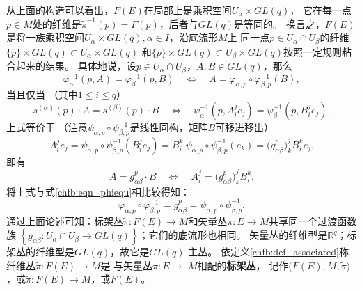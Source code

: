 从上面的构造可以看出，$F(E)$在局部上是乘积空间$U_{\alpha} \times GL(q)$，
它在每一点$p \in M$处的纤维是$\tilde{\pi}^{-1}(p)=F(p)$，后者与$GL(q)$是等同的。
换言之，$F(E)$是将一族乘积空间$U_{\alpha} \times GL(q), \alpha \in I$，沿底流形$M$上
同一点$p \in U_{\alpha} \cap U_{\beta}$的纤维$\{p\} \times GL(q) \subset U_{\alpha} \times GL(q)$
和$\{p\} \times GL(q) \subset U_{\beta} \times GL(q)$按照一定规则粘合起来的结果。
具体地说，设$p \in U_{\alpha} \cap U_{\beta}$，$ A, B \in GL(q)$，那么
\begin{equation}\label{chfb:eqn_phiequ}
    \varphi_{\alpha}^{-1}(p, A)=\varphi_{\beta}^{-1}(p, B)
    \quad \Leftrightarrow \quad
    A=\varphi_{\alpha, p} \circ \varphi_{\beta, p}^{-1}(B) ,
\end{equation}
当且仅当 （其中$1 \leqslant i \leqslant q $）
\begin{equation}
    s^{(\alpha)}(p) \cdot A=s^{(\beta)}(p) \cdot B
    \quad \Leftrightarrow \quad
    \psi_{\alpha}^{-1}(p, A_{i}^{j} e_{j})
    =\psi_{\beta}^{-1}(p, B_{i}^{j} e_{j}).
\end{equation}
上式等价于 （注意$\psi_{\alpha, p} \circ \psi_{\beta, p}^{-1}$是线性同构，矩阵$B$可移进移出）
\begin{equation}
    A_{i}^{j} e_{j}=\psi_{\alpha, p} \circ \psi_{\beta, p}^{-1}(B_{i}^{j}e_{j})
    =B_{i}^{k}\ \psi_{\alpha, p} \circ \psi_{\beta, p}^{-1}(e_{k})
    =\bigl(g_{\alpha \beta}^p\bigr)_{k}^{j} B_{i}^{k} e_{j} .
\end{equation}
即有
\begin{equation}\label{chfb:eqn_agb}
    A=g_{\alpha \beta}^p \cdot B \quad \Leftrightarrow \quad
    A_{i}^{j}  = \bigl(g_{\alpha \beta}^p\bigr)_{k}^{j} B_{i}^{k}.
\end{equation}
将上式与式\eqref{chfb:eqn_phiequ}相比较得知：
\begin{equation}
    \varphi_{\alpha, p} \circ \varphi_{\beta, p}^{-1}=g_{\alpha \beta}^p
    =\psi_{\alpha, p} \circ \psi_{\beta, p}^{-1}.
\end{equation}
通过上面论述可知：标架丛$\tilde{\pi}: F(E) \rightarrow M$和矢量丛$\pi: E \rightarrow M$共享同一个过渡函数族
$\left\{g_{\alpha \beta}: U_{\alpha} \cap U_{\beta} \rightarrow GL(q)\right\}$；它们的底流形也相同。
矢量丛的纤维型是$\mathbb{R}^q$；标架丛的纤维型是$GL(q)$，故它是$GL(q)$-主丛。
依定义\ref{chfb:def_associated}称纤维丛$\tilde{\pi}: F(E) \rightarrow M$是
与矢量丛$\pi: E \rightarrow$ $M$相配的\textbf{标架丛}，
记作$\bigl(F(E), M, \tilde{\pi}\bigr)$，或$\tilde{\pi}: F(E) \rightarrow M$，或$F(E)$。

